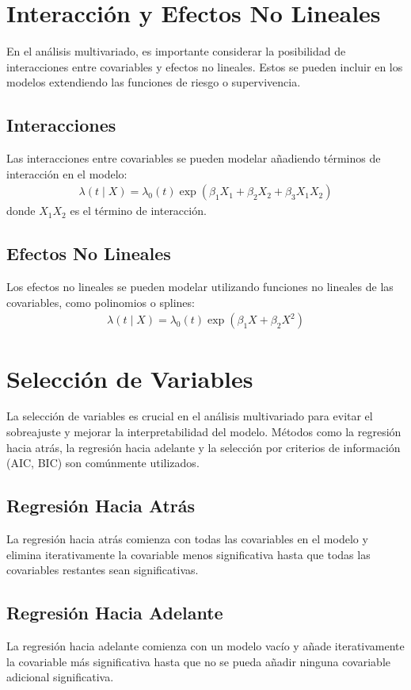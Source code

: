 \documentclass[a4paper]{report} %
\begin{document}
\section{Interacci\'on y Efectos No Lineales}
En el an\'alisis multivariado, es importante considerar la posibilidad de interacciones entre covariables y efectos no lineales. Estos se pueden incluir en los modelos extendiendo las funciones de riesgo o supervivencia.

\subsection{Interacciones}
Las interacciones entre covariables se pueden modelar a\~nadiendo t\'erminos de interacci\'on en el modelo:
\begin{eqnarray*}
\lambda(t \mid X) = \lambda_0(t) \exp(\beta_1 X_1 + \beta_2 X_2 + \beta_3 X_1 X_2)
\end{eqnarray*}
donde $X_1 X_2$ es el t\'ermino de interacci\'on.

\subsection{Efectos No Lineales}
Los efectos no lineales se pueden modelar utilizando funciones no lineales de las covariables, como polinomios o splines:
\begin{eqnarray*}
\lambda(t \mid X) = \lambda_0(t) \exp(\beta_1 X + \beta_2 X^2)
\end{eqnarray*}

\section{Selecci\'on de Variables}
La selecci\'on de variables es crucial en el an\'alisis multivariado para evitar el sobreajuste y mejorar la interpretabilidad del modelo. M\'etodos como la regresi\'on hacia atr\'as, la regresi\'on hacia adelante y la selecci\'on por criterios de informaci\'on (AIC, BIC) son com\'unmente utilizados.

\subsection{Regresi\'on Hacia Atr\'as}
La regresi\'on hacia atr\'as comienza con todas las covariables en el modelo y elimina iterativamente la covariable menos significativa hasta que todas las covariables restantes sean significativas.

\subsection{Regresi\'on Hacia Adelante}
La regresi\'on hacia adelante comienza con un modelo vac\'io y a\~nade iterativamente la covariable m\'as significativa hasta que no se pueda a\~nadir ninguna covariable adicional significativa.
\end{document}
